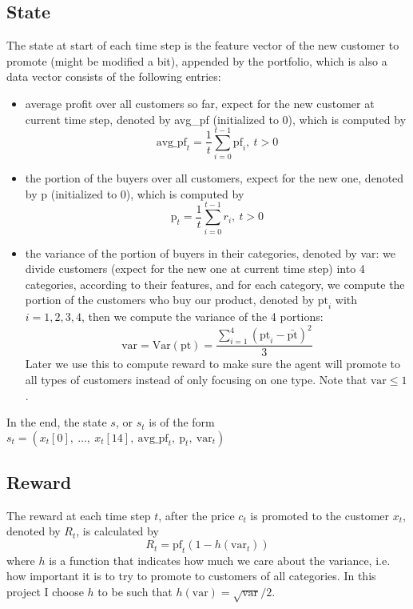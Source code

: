 \documentclass[11pt]{article}
\begin{document}
\subsection{State}
The state at start of each time step is the feature vector of the new customer 
to promote (might be modified a bit), appended by the portfolio, which is also 
a data vector consists of the following entries:
\begin{itemize}
    \item average profit over all customers so far, expect for the new customer
        at current time step, denoted by avg\_pf (initialized to \(0\)), 
        which is computed by
        \[\text{avg\_pf}_t = \frac{1}{t}\sum_{i=0}^{t-1} \text{pf}_i, \:t>0\]
    \item the portion of the buyers over all customers, expect for the new one,
        denoted by p (initialized to 0), which is computed by
        \[\text{p}_t=\frac{1}{t}\sum_{i=0}^{t-1} r_i, \:t>0\]
    \item the variance of the portion of buyers in their categories, denoted 
        by var: we divide customers (expect for the new one at current time 
        step) into 4 categories, according to their features, and for each 
        category, we compute the portion of the customers who buy our product,
        denoted by \(\text{pt}_i\) with \(i=1, 2, 3, 4\), then we compute the 
        variance of the 4 portions:
        \[\text{var}=\text{Var}(\text{pt})=\frac{\sum_{i=1}^{4} 
        \left(\text{pt}_i-\bar{\text{pt}}\right)^2}{3}\]
        Later we use this to compute reward to 
        make sure the agent will promote to all types of customers instead of 
        only focusing on one type.
        \vspace{2mm}\newline Note that \(\text{var}\leq1\).
\end{itemize}
In the end, the state \(s\), or \(s_t\) is of the form 
\(s_t=(x_t[0],\:\dots,\:x_t[14],\:\text{avg\_pf}_t,\:\text{p}_t,
\:\text{var}_t)\)

\subsection{Reward}
The reward at each time step \(t\), after the price \(c_t\) is promoted to the 
customer \(x_t\), denoted by \(R_t\), is calculated by
\[R_t = \text{pf}_t\left(1-h(\text{var}_t)\right)\]
where \(h\) is a function that indicates how much we care about the variance,
i.e. how important it is to try to promote to customers of all categories. In
this project I choose \(h\) to be such that 
\(h(\text{var}) = \sqrt{\text{var}}/2\).
\end{document}
